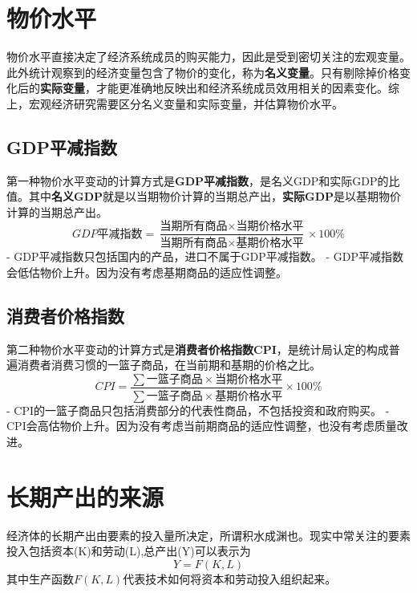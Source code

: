 \documentclass[
  11pt,
  letterpaper,
]{ctexbook}
\begin{document}
\section{物价水平}\label{ux7269ux4ef7ux6c34ux5e73}

物价水平直接决定了经济系统成员的购买能力，因此是受到密切关注的宏观变量。此外统计观察到的经济变量包含了物价的变化，称为\textbf{名义变量}。只有剔除掉价格变化后的\textbf{实际变量}，才能更准确地反映出和经济系统成员效用相关的因素变化。综上，宏观经济研究需要区分名义变量和实际变量，并估算物价水平。

\subsection{GDP平减指数}\label{gdpux5e73ux51cfux6307ux6570}

第一种物价水平变动的计算方式是\textbf{GDP平减指数}，是名义GDP和实际GDP的比值。其中\textbf{名义GDP}就是以当期物价计算的当期总产出，\textbf{实际GDP}是以基期物价计算的当期总产出。
\[
GDP\text{平减指数} = \frac{\text{当期所有商品} \times \text{当期价格水平}}{\text{当期所有商品} \times \text{基期价格水平}} \times 100\%
\] - GDP平减指数只包括国内的产品，进口不属于GDP平减指数。 -
GDP平减指数会低估物价上升。因为没有考虑基期商品的适应性调整。

\subsection{消费者价格指数}\label{ux6d88ux8d39ux8005ux4ef7ux683cux6307ux6570}

第二种物价水平变动的计算方式是\textbf{消费者价格指数CPI}，是统计局认定的构成普遍消费者消费习惯的一篮子商品，在当前期和基期的价格之比。\\
\[
CPI=\frac{\sum \text{一篮子商品} \times \text{当期价格水平}}{\sum \text{一篮子商品} \times \text{基期价格水平}} \times 100\%
\] - CPI的一篮子商品只包括消费部分的代表性商品，不包括投资和政府购买。 -
CPI会高估物价上升。因为没有考虑当前期商品的适应性调整，也没有考虑质量改进。

\section{长期产出的来源}\label{ux957fux671fux4ea7ux51faux7684ux6765ux6e90}

经济体的长期产出由要素的投入量所决定，所谓积水成渊也。现实中常关注的要素投入包括资本(K)和劳动(L),总产出(Y)可以表示为
\[
Y=F(K,L)
\] 其中生产函数\(F(K,L)\)代表技术如何将资本和劳动投入组织起来。
\end{document}
